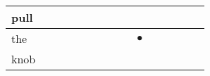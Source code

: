 \documentclass[landscape]{article}
\newcommand{\ssp}{\hspace{2pt}}
\newcommand{\mex}{\cellcolor{g}$\bullet$}
\begin{document}
\begin{tabular}{|l|p{10pt}|p{10pt}|p{10pt}|p{10pt}|p{10pt}|p{10pt}|p{10pt}|p{10pt}|p{10pt}|p{10pt}|p{10pt}|p{10pt}|p{10pt}|p{10pt}|}
\hline
\ssp pull \ssp&\hspace{2pt}&\hspace{2pt}&\hspace{2pt}&\hspace{2pt}&\hspace{2pt}&\hspace{2pt}&\hspace{2pt}&\hspace{2pt}&\hspace{2pt}&\hspace{2pt}&\hspace{2pt}&\hspace{2pt}&\hspace{2pt}&\hspace{2pt}\\
\hline
\ssp \cellcolor{ref8}the \ssp&\hspace{2pt}&\hspace{2pt}&\hspace{2pt}&\hspace{2pt}&\hspace{2pt}&\hspace{2pt}&\hspace{2pt}&\hspace{2pt}&\hspace{2pt}\mex&\hspace{2pt}&\hspace{2pt}&\hspace{2pt}&\hspace{2pt}&\hspace{2pt}\\
\hline
\ssp knob \ssp&\hspace{2pt}&\hspace{2pt}&\hspace{2pt}&\hspace{2pt}&\hspace{2pt}&\hspace{2pt}&\hspace{2pt}&\hspace{2pt}&\hspace{2pt}&\hspace{2pt}&\hspace{2pt}&\hspace{2pt}&\hspace{2pt}&\hspace{2pt}\\
\hline

\end{tabular}
\end{document}
